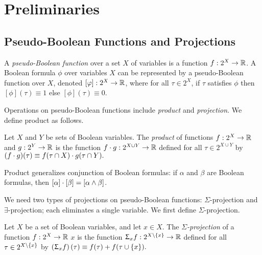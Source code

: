 






\section{Preliminaries}

\subsection{Pseudo-Boolean Functions and Projections}

A \emph{pseudo-Boolean function} over a set $X$ of variables is a function $f: 2^X \to \mathbb{R}$. A Boolean formula $\phi$ over variables $X$ can be represented by a pseudo-Boolean function over $X$, denoted $[\varphi]: 2^X \rightarrow \mathbb{R}$,
where for all $\tau \in 2^X$, if $\tau$ satisfies $\phi$ then $[\phi](\tau) \equiv 1$ else $[\phi](\tau) \equiv 0$.

Operations on pseudo-Boolean functions include \emph{product} and \emph{projection}.
We define product as follows.
\begin{definition}
\label{def_mult_pro}
    Let $X$ and $Y$ be sets of Boolean variables.
    The \emph{product} of functions $f: 2^X \to \mathbb{R}$ and $g: 2^Y \to \mathbb{R}$ is the function $f \cdot g: 2^{X \cup Y} \to \mathbb{R}$ defined for all $\tau \in 2^{X \cup Y}$ by
    $(f \cdot g)(\tau) \equiv f(\tau \cap X) \cdot g(\tau \cap Y).$
\end{definition}

Product generalizes conjunction of Boolean formulas: if $\alpha$ and $\beta$ are Boolean formulas, then $[\alpha] \cdot [\beta] = [\alpha \land \beta]$.

We need two types of projections on pseudo-Boolean functions: $\Sigma$-projection and $\exists$-projection; each eliminates a single variable. 
We first define $\Sigma$-projection.
\begin{definition}
\label{def_sum}
    Let $X$ be a set of Boolean variables, and let $x \in X$.
    The \emph{$\Sigma$-projection} of a function $f: 2^X \to \mathbb{R}$ \wrt{} $x$ is the function $\Upsigma_x f: 2^{X \setminus \left\{ x \right\}} \to \mathbb{R}$ defined for all $\tau \in 2^{X \setminus \left\{ x \right\}}$ by
    $\left( \Upsigma_x f \right)(\tau) \equiv f(\tau) + f(\tau \cup \left\{ x \right\}).$
\end{definition}

